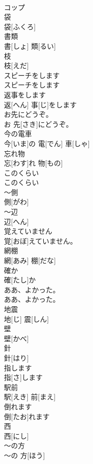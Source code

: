 \documentclass[8pt]{extreport}
\begin{document}
\begin{CJK}{UTF8}{min}
\\	コップ		
\\	袋	
\\	袋[ふくろ]		
\\	書類	
\\	書[しょ] 類[るい]		
\\	枝	
\\	枝[えだ]		
\\	スピーチをします	
\\	スピーチをします		
\\	返事をします	
\\	返[へん] 事[じ]をします		
\\	お先にどうぞ。	
\\	お 先[さき]にどうぞ。		
\\	今の電車	
\\	今[いま]の 電[でん] 車[しゃ]		
\\	忘れ物	
\\	忘[わす]れ 物[もの]		
\\	このくらい	
\\	このくらい		
\\	～側	
\\	側[がわ]		
\\	～辺	
\\	辺[へん]		
\\	覚えていません	
\\	覚[おぼ]えていません。		
\\	網棚	
\\	網[あみ] 棚[だな]		
\\	確か	
\\	確[たし]か		
\\	ああ、よかった。	
\\	ああ、よかった。		
\\	地震	
\\	地[じ] 震[しん]		
\\	壁	
\\	壁[かべ]		
\\	針	
\\	針[はり]		
\\	指します	
\\	指[さ]します		
\\	駅前	
\\	駅[えき] 前[まえ]		
\\	倒れます	
\\	倒[たお]れます		
\\	西	
\\	西[にし]		
\\	～の方	
\\	～の 方[ほう]		

\end{CJK}
\end{document}
